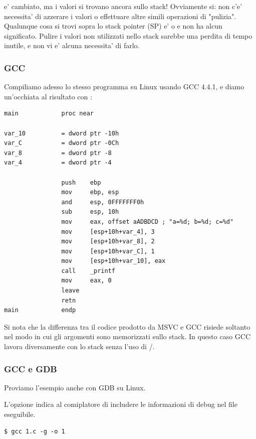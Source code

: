 \ESP e' cambiato, ma i valori si trovano ancora sullo stack!
Ovviamente si: non c'e' necessita' di azzerare i valori o effettuare altre simili operazioni di "pulizia".
Qualunque cosa si trovi sopra lo stack pointer (\ac{SP}) e'  o \IT{\garbage{}} e non ha alcun significato.
Pulire i valori non utilizzati nello stack sarebbe una perdita di tempo inutile, e non vi e' alcuna necessita' di farlo.

\fi %

\ifdefined\IncludeGCC
\subsubsection{GCC}

Compiliamo adesso lo stesso programma su Linux usando GCC 4.4.1, e diamo un'occhiata al risultato con \IDA:

\begin{lstlisting}
main            proc near

var_10          = dword ptr -10h
var_C           = dword ptr -0Ch
var_8           = dword ptr -8
var_4           = dword ptr -4

                push    ebp
                mov     ebp, esp
                and     esp, 0FFFFFFF0h
                sub     esp, 10h
                mov     eax, offset aADBDCD ; "a=%d; b=%d; c=%d"
                mov     [esp+10h+var_4], 3
                mov     [esp+10h+var_8], 2
                mov     [esp+10h+var_C], 1
                mov     [esp+10h+var_10], eax
                call    _printf
                mov     eax, 0
                leave
                retn
main            endp
\end{lstlisting}

Si nota che la differenza tra il codice prodotto da MSVC e GCC risiede soltanto nel modo in cui gli argomenti sono memorizzati sullo stack.
In questo caso GCC lavora diversamente con lo stack senza l'uso di \PUSH/\POP.

\ifdefined\IncludeGDB
\subsubsection{GCC e GDB}

Proviamo l'esempio anche con \ac{GDB} su Linux.

L'opzione  indica al comiplatore di includere le informazioni di debug nel file eseguibile.

\begin{lstlisting}
$ gcc 1.c -g -o 1
\end{lstlisting}

